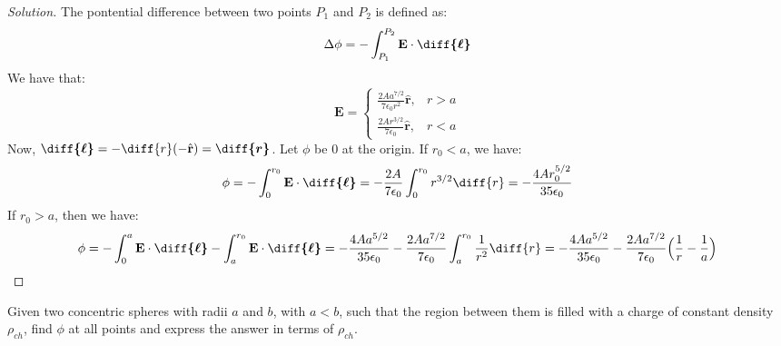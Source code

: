 \documentclass[crop=false,class=book,oneside]{standalone}
\begin{document}
            \begin{proof}[Solution]
                The pontential difference between two points
                $P_{1}$ and $P_{2}$ is defined as:
                \begin{equation*}
                    \Delta\phi=-\int_{P_{1}}^{P_{2}}
                    \mathbf{E}\cdot\boldsymbol{\diff{\ell}}
                \end{equation*}
                We have that:
                \begin{equation*}
                    \mathbf{E}
                    =
                    \begin{cases}
                        \frac{2Aa^{7/2}}{7\epsilon_{0}r^{2}}
                        \hat{\mathbf{r}},
                        &r>a\\
                        \frac{2Ar^{3/2}}{7\epsilon_{0}}
                        \hat{\mathbf{r}},
                        &r<a
                    \end{cases}    
                \end{equation*}
                Now,
                $\boldsymbol{\diff{\ell}}%
                 =-\diff{r}(-\hat{\mathbf{r}})%
                 =\boldsymbol{\diff{r}}$.
                Let $\phi$ be $0$ at the origin.
                If $r_{0}<a$, we have:
                \begin{equation*}
                    \phi
                    =-\int_{0}^{r_{0}}
                    \mathbf{E}\cdot\boldsymbol{\diff{\ell}}
                    =-\frac{2A}{7\epsilon_{0}}
                    \int_{0}^{r_{0}}r^{3/2}\diff{r}
                    =-\frac{4Ar_{0}^{5/2}}{35\epsilon_{0}}
                \end{equation*}
                If $r_{0}>a$, then we have:
                \begin{equation*}
                    \phi
                    =-\int_{0}^{a}
                    \mathbf{E}\cdot\boldsymbol{\diff{\ell}}
                    -\int_{a}^{r_{0}}
                    \mathbf{E}\cdot\boldsymbol{\diff{\ell}}
                    =-\frac{4Aa^{5/2}}{35\epsilon_{0}}
                    -\frac{2Aa^{7/2}}{7\epsilon_{0}}
                    \int_{a}^{r_{0}}\frac{1}{r^{2}}\diff{r}
                    =-\frac{4Aa^{5/2}}{35\epsilon_{0}}
                    -\frac{2Aa^{7/2}}{7\epsilon_{0}}
                    \Big(\frac{1}{r}-\frac{1}{a}\Big)
                \end{equation*}
            \end{proof}
            \begin{problem}[Wangsness 5-11]
                Given two concentric spheres with radii
                $a$ and $b$, with $a<b$, such that the region
                between them is filled with a charge of constant
                density $\rho_{ch}$, find $\phi$ at all points
                and express the answer in terms of $\rho_{ch}$.
            \end{problem}
\end{document}
